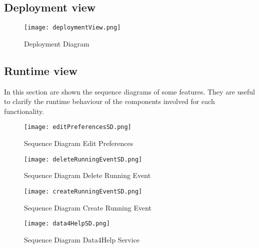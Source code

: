 \documentclass[../main.tex]{subfiles}
\begin{document}
\subsection{Deployment view}

\begin{figure}[H]
        \centering
             \texttt{[image: deploymentView.png]}
              \caption{Deployment Diagram }
               \label{fig:deploymentView}
\end{figure}

\newpage

\subsection{Runtime view}
In this section are shown the sequence diagrams of some features. They are useful to clarify the runtime behaviour of the components involved for each functionality.
\begin{figure}[H]
        \centering
             \texttt{[image: editPreferencesSD.png]}
              \caption{Sequence Diagram Edit Preferences }
               \label{fig:editPreferencesSD}
\end{figure}

\vspace*{2cm}

\begin{figure}[H]
        \centering
             \texttt{[image: deleteRunningEventSD.png]}
              \caption{Sequence Diagram Delete Running Event }
               \label{fig:deleteRunningEventSD}
\end{figure}

\vspace*{2cm}

\begin{figure}[H]
        \centering
             \texttt{[image: createRunningEventSD.png]}
              \caption{Sequence Diagram Create Running Event }
               \label{fig:createRunningEventSD}
\end{figure}

\vspace*{2cm}

\begin{figure}[H]
        \centering
             \texttt{[image: data4HelpSD.png]}
              \caption{Sequence Diagram Data4Help Service }
               \label{fig:data4HelpSD}
\end{figure}
\end{document}
